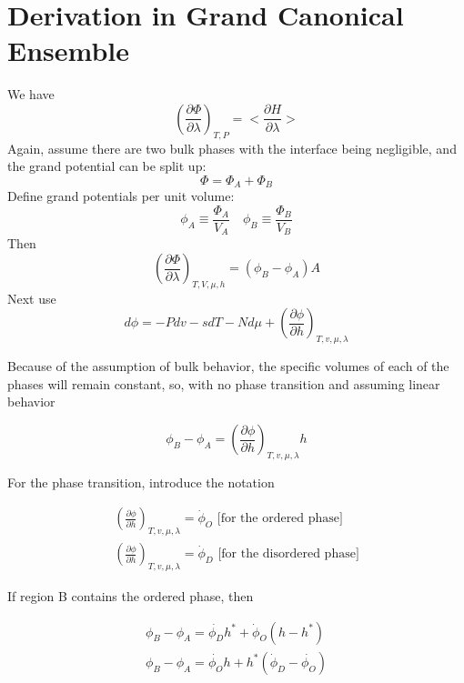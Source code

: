 \documentclass[11pt, oneside]{article}   	%
\begin{document}
\section{Derivation in Grand Canonical Ensemble}
We have
\begin{equation}
\left(\frac{\partial \Phi}{\partial \lambda}\right)_{T,P} = <\frac{\partial H}{\partial \lambda}>
\end{equation}
Again, assume there are two bulk phases with the interface being negligible, and the grand potential can be split up:
\begin{equation}
\Phi = \Phi_A+\Phi_B
\end{equation}
Define grand potentials per unit volume:
\begin{equation}
\phi_A\equiv\frac{\Phi_A}{V_A} \quad \phi_B\equiv\frac{\Phi_B}{V_B} 
\end{equation}
Then
\begin{equation}
\left(\frac{\partial\Phi}{\partial\lambda}\right)_{T,V,\mu,h} = \left(\phi_B-\phi_A\right)A
\end{equation}
Next use
\begin{equation}
d\phi=-Pdv-sdT-Nd\mu+\left(\frac{\partial\phi}{\partial h}\right)_{T,v,\mu,\lambda}
\end{equation}

Because of the assumption of bulk behavior, the specific volumes of each of the phases will remain constant, so, with no phase transition and assuming linear behavior

\begin{equation}
\phi_B-\phi_A=\left(\frac{\partial\phi}{\partial h}\right)_{T,v,\mu,\lambda}h
\end{equation}

For the phase transition, introduce the notation

\begin{gather}
\left(\frac{\partial\phi}{\partial h}\right)_{T,v,\mu,\lambda}=\dot{\phi}_O \text{     [for the ordered phase]}\\
\left(\frac{\partial\phi}{\partial h}\right)_{T,v,\mu,\lambda}=\dot{\phi}_D \text{     [for the disordered phase]}
\end{gather}

If region B contains the ordered phase, then

\begin{gather}
\phi_B-\phi_A = \dot{\phi_D}h^*+\dot{\phi}_O(h-h^*)\\
\phi_B-\phi_A = \dot{\phi_O}h+h^*(\dot{\phi}_D - \dot{\phi_O})
\end{gather}
\end{document}
